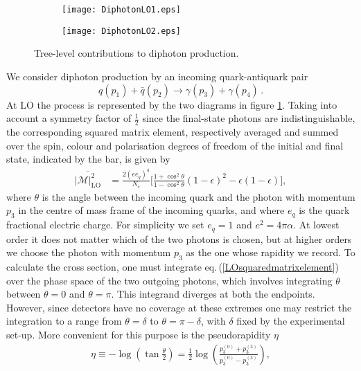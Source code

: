 \documentclass[11pt]{article}
\newcommand{\M}{\mathcal{M}}
\newcommand\eqn[1]     {eq.\,(\ref{#1})}
\begin{document}
\begin{figure}[h!]
\centering
\begin{subfigure}[b]{.35\linewidth}
\texttt{[image: DiphotonLO1.eps]}
\end{subfigure}
\hspace{2cm}
\begin{subfigure}[b]{.35\linewidth}
\texttt{[image: DiphotonLO2.eps]}
\end{subfigure}
\caption{Tree-level contributions to diphoton production.}
\label{fig:diph-tree}
\end{figure}
%
\noindent We consider diphoton production by an incoming quark-antiquark pair
\begin{equation}
    q(p_1)+\bar{q}(p_2) \to \gamma(p_3)+\gamma(p_4)\,.
\end{equation}
At LO the process is represented by the two diagrams in figure \ref{fig:diph-tree}. Taking into account a symmetry factor 
of $\tfrac{1}{2}$ since the final-state photons are indistinguishable,
the corresponding squared matrix element, respectively 
averaged and summed over the spin, colour and polarisation 
degrees of freedom of the initial and final state, indicated by the bar, is given 
by 
\begin{align}
    \overline{\left|\M\right|_\text{LO}^2} 
    &= \frac{2(ee_q)^4}{N_c} \Bigg[\frac{1+\cos^2\theta}{1-\cos^2\theta}(1-\epsilon)^2-\epsilon(1-\epsilon)\bigg]\label{LOsquaredmatrixelement},
\end{align}
where $\theta$ is the angle between the incoming quark 
and the photon with momentum $p_3$ in the centre of mass 
frame of the incoming quarks, and where $e_q$ is the quark fractional
electric charge. For simplicity we set $e_q = 1$ and 
$e^2 = 4\pi \alpha$. At lowest order it does 
not matter which of the two photons is chosen, but at higher orders
we choose the photon with momentum $p_3$ as the one whose rapidity we record.
To calculate the cross section, 
one must integrate \eqn{LOsquaredmatrixelement} over 
the phase space of the two outgoing photons, which involves integrating $\theta$ between $\theta=0$ 
and $\theta=\pi$. This integrand diverges at both the
endpoints. However, since detectors have no coverage at these extremes
one may restrict the integration to a range from $\theta = \delta$ 
to $\theta =\pi - \delta$, with $\delta$ 
fixed by the experimental set-up. More convenient for this purpose
is the  pseudorapidity $\eta$
\begin{align}
\eta \equiv -\log\left(\tan\frac{\theta}{2}\right) = \frac12 \log\left(\frac{p_3^{(0)}+p_3^{(3)}}{p_3^{(0)}-p_3^{(3)}}\right)\label{rapidity},
\end{align}
\end{document}
